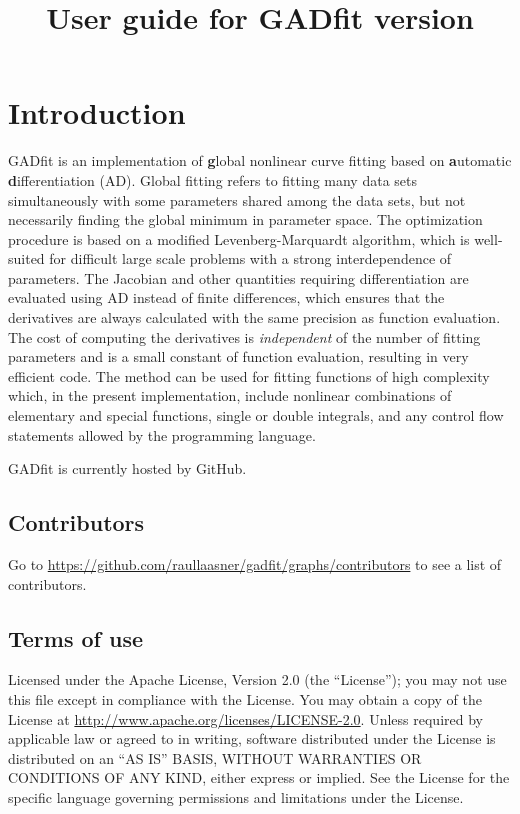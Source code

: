 \documentclass{article}
\title{User guide for GADfit version \version}
\date{\monthname {} \the\year}
\begin{document}
\maketitle
\tableofcontents

\section{Introduction}

GADfit is an implementation of \textbf{g}lobal nonlinear curve fitting based on \textbf{a}utomatic \textbf{d}ifferentiation (AD). Global fitting refers to fitting many data sets simultaneously with some parameters shared among the data sets, but not necessarily finding the global minimum in parameter space. The optimization procedure is based on a modified Levenberg-Marquardt algorithm, which is well-suited for difficult large scale problems with a strong interdependence of parameters. The Jacobian and other quantities requiring differentiation are evaluated using AD instead of finite differences, which ensures that the derivatives are always calculated with the same precision as function evaluation. The cost of computing the derivatives is \textit{independent} of the number of fitting parameters and is a small constant of function evaluation, resulting in very efficient code. The method can be used for fitting functions of high complexity which, in the present implementation, include nonlinear combinations of elementary and special functions, single or double integrals, and any control flow statements allowed by the programming language.

GADfit is currently hosted by GitHub.

\subsection{Contributors}

Go to \url{https://github.com/raullaasner/gadfit/graphs/contributors} to see a list of contributors.

\subsection{Terms of use}

Licensed under the Apache License, Version 2.0 (the ``License''); you may not use this file except in compliance with the License. You may obtain a copy of the License at \url{http://www.apache.org/licenses/LICENSE-2.0}. Unless required by applicable law or agreed to in writing, software distributed under the License is distributed on an ``AS IS'' BASIS, WITHOUT WARRANTIES OR CONDITIONS OF ANY KIND, either express or implied. See the License for the specific language governing permissions and limitations under the License.
\end{document}
